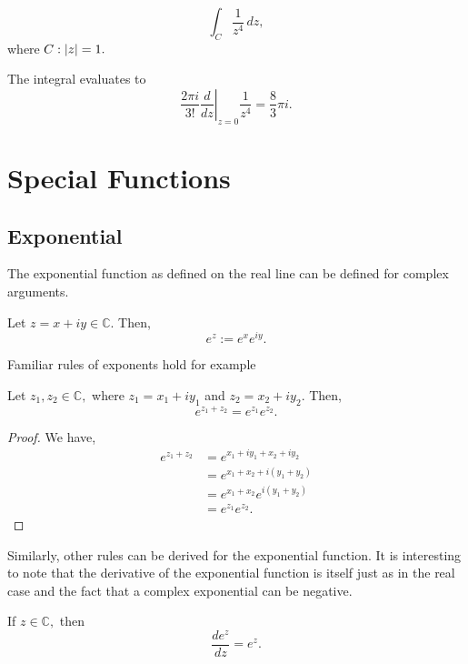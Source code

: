 \documentclass[12pt]{book}
\begin{document}
\begin{exmp}
    \[
        \int_{C} \frac{1}{z^4}\,dz,
    \]
    where $C: \left\lvert z \right\rvert = 1.$
\end{exmp}
The integral evaluates to 
\[
    \frac{2\pi i}{3!} \left.\frac{d}{dz}\right\rvert_{z = 0}\frac{1}{z^4} = \frac{8}{3} \pi i.
\]



\section{Special Functions}
\subsection{Exponential}
The exponential function as defined on the real line can be defined for complex arguments. 
\begin{defn}
    Let $z = x + iy \in \mathbb{C}.$ Then,
    \[
        e^{z} := e^{x}e^{iy}.
    \]
\end{defn}
Familiar rules of exponents hold for example 
\begin{thm}
    Let $z_1, z_2 \in \mathbb{C},$ where $z_1 = x_1 + iy_1$ and $z_2 = x_2 + iy_2$. Then,
    \[
        e^{z_1 + z_2} = e^{z_1}e^{z_2}.
    \]
\end{thm}
\begin{proof}
    We have,
    \begin{align*}
        e^{z_1 + z_2}
            &=
                e^{x_1 + iy_1 + x_2 + iy_2}\\
            &=
                e^{x_1 + x_2 + i(y_1 + y_2)}\\
            &=
                e^{x_1 + x_2}e^{i(y_1 + y_2)}\\
            &=
                e^{z_1}e^{z_2}.
    \end{align*}
\end{proof}
Similarly, other rules can be derived for the exponential function. It is interesting to note that the derivative of the exponential function is itself just as in the real case and the fact that a complex exponential can be negative. 
\begin{thm}
    If $z \in \mathbb{C},$ then
    \[
        \frac{d e^{z}}{d z} = e^{z}.
    \]
\end{thm}
\end{document}

